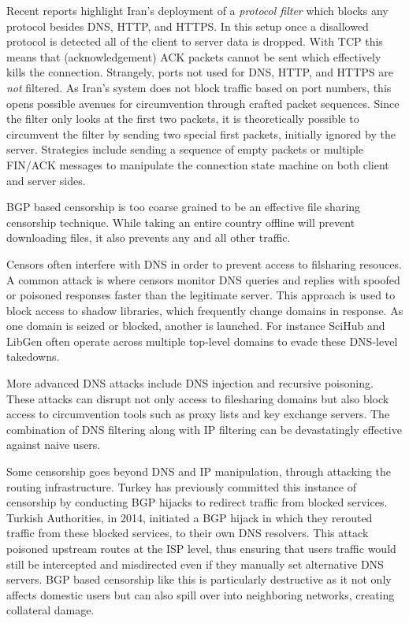 Recent reports highlight Iran's deployment of a \emph{protocol filter} which blocks any
protocol besides DNS, HTTP, and HTTPS.
\cite{bockDetectingEvadingCensorshipDepth} In this setup once a disallowed
protocol is detected all of the client to server data is dropped. With TCP this
means that (acknowledgement) ACK packets cannot be sent which effectively kills the connection.
\cite[\S 4.1]{bockDetectingEvadingCensorshipDepth} Strangely, ports not used for
DNS, HTTP, and HTTPS are \emph{not} filtered. As Iran’s system does not block traffic based on port 
numbers, this opens possible avenues for circumvention through crafted packet sequences.
Since the filter only looks at the first two packets, it is theoretically possible to 
circumvent the filter by sending two special first packets, initially ignored by the 
server. Strategies include sending a sequence of empty packets or multiple FIN/ACK messages 
to manipulate the connection state machine on both client and server sides.

BGP based censorship is too coarse grained to be an effective file sharing
censorship technique. While taking an entire country offline will prevent
downloading files, it also prevents any and all other traffic.\cite[p.\@
      5]{wendzelSurveyInternetCensorship2025}

Censors often interfere with DNS in order to prevent access to filsharing resouces. A
common attack is where censors monitor DNS queries and replies with spoofed or poisoned 
responses faster than the legitimate server. This approach is used to block access to shadow libraries, 
which frequently change domains in response. As one domain is seized or blocked, another is launched. 
For instance SciHub and LibGen often operate across multiple top-level domains to evade these 
DNS-level takedowns. 

More advanced DNS attacks include DNS injection and recursive poisoning. These attacks can disrupt 
not only access to filesharing domains but also block access to circumvention tools such as proxy 
lists and key exchange servers. The combination of DNS filtering along with IP filtering can be devastatingly 
effective against naive users.

Some censorship goes beyond DNS and IP manipulation, through attacking the routing infrastructure. Turkey
has previously committed this instance of censorship by conducting BGP hijacks to redirect traffic from 
blocked services. Turkish Authorities, in 2014, initiated a BGP hijack in which they rerouted traffic 
from these blocked services, to their own DNS resolvers. This attack poisoned upstream routes at the ISP level, 
thus ensuring that users traffic would still be intercepted and misdirected even if they manually 
set alternative DNS servers. BGP based censorship like this is particularly destructive as it not only 
affects domestic users but can also spill over into neighboring networks, creating collateral damage. 

